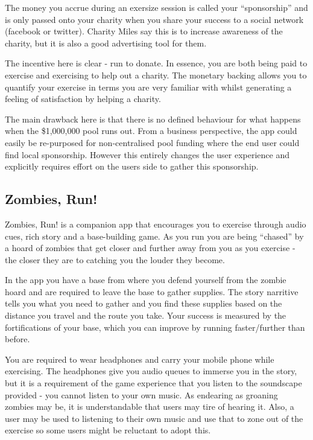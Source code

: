 The money you accrue during an exersize session is called your
``sponsorship'' and is only passed onto your charity when you share
your success to a social network (facebook or
twitter)\cite{charitymiles_terms}. Charity Miles say this is to
increase awareness of the charity, but it is also a good advertising
tool for them.

The incentive here is clear - run to donate. In essence, you are both
being paid to exercise and exercising to help out a charity. The
monetary backing allows you to quantify your exercise in terms you are
very familiar with whilst generating a feeling of satisfaction by
helping a charity.

The main drawback here is that there is no defined behaviour for what
happens when the \$1,000,000 pool runs out. From a business
perspective, the app could easily be re-purposed for non-centralised
pool funding where the end user could find local sponsorship. However
this entirely changes the user experience and explicitly requires
effort on the users side to gather this sponsorship. 

\subsection{Zombies, Run!}
Zombies, Run! is a companion app that encourages you to exercise through
audio cues, rich story and a base-building game. As you run you are
being ``chased'' by a hoard of zombies that get closer and further
away from you as you exercise - the closer they are to catching you
the louder they become. 

In the app you have a base from where you defend yourself from the
zombie hoard and are required to leave the base to gather
supplies. The story narritive tells you what you need to gather and
you find these supplies based on the distance you travel and the route
you take. Your success is measured by the fortifications of your base,
which you can improve by running faster/further than before.

You are required to wear headphones and carry your mobile phone while
exercising. The headphones give you audio queues to immerse you in the
story, but it is a requirement of the game experience that you listen
to the soundscape provided - you cannot listen to your own music. As
endearing as groaning zombies may be, it is understandable that users
may tire of hearing it. Also, a user may be used to listening to their
own music and use that to zone out of the exercise so some users might
be reluctant to adopt this.


